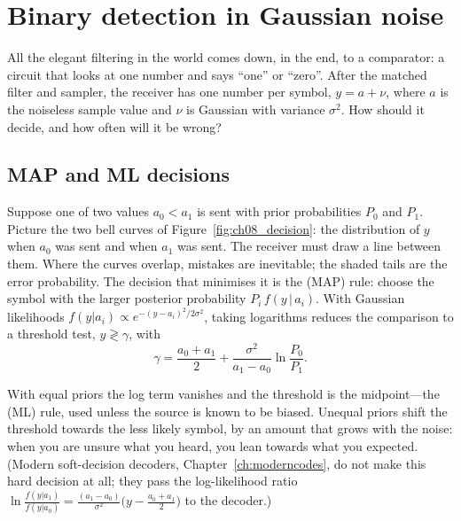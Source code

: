 \section{Binary detection in Gaussian noise}
\label{sec:ch08:binary}

All the elegant filtering in the world comes down, in the end, to a comparator: a circuit that
looks at one number and says ``one'' or ``zero''. After the matched filter and sampler, the
receiver has one number per symbol, $y=a+\nu$, where $a$ is the noiseless sample value and
$\nu$ is Gaussian with variance $\sigma^2$. How should it decide, and how often will it be
wrong?


\subsection{MAP and ML decisions}

Suppose one of two values $a_0<a_1$ is sent with prior probabilities $P_0$ and $P_1$. Picture
the two bell curves of Figure~\ref{fig:ch08_decision}: the distribution of $y$ when $a_0$ was
sent and when $a_1$ was sent. The receiver must draw a line between them. Where the curves
overlap, mistakes are inevitable; the shaded tails are the error probability. The decision
that minimises it is the  (MAP) rule: choose the symbol with the
larger posterior probability $P_i\,f(y\,|\,a_i)$. With Gaussian likelihoods
$f(y|a_i)\propto e^{-(y-a_i)^2/2\sigma^2}$, taking logarithms reduces the comparison to a
threshold test, $y\gtrless\gamma$, with
\begin{equation}
\gamma=\frac{a_0+a_1}{2}+\frac{\sigma^2}{a_1-a_0}\ln\frac{P_0}{P_1}.
\label{eq:ch08:map}
\end{equation}

With equal priors the log term vanishes and the threshold is the midpoint---the
 (ML) rule, used unless the source is known to be biased. Unequal
priors shift the threshold towards the less likely symbol, by an amount that grows with the
noise: when you are unsure what you heard, you lean towards what you expected. (Modern
soft-decision decoders, Chapter~\ref{ch:moderncodes}, do not make this hard decision at all;
they pass the log-likelihood ratio
$\ln\frac{f(y|a_1)}{f(y|a_0)}=\frac{(a_1-a_0)}{\sigma^2}\big(y-\frac{a_0+a_1}2\big)$ to the
decoder.)

